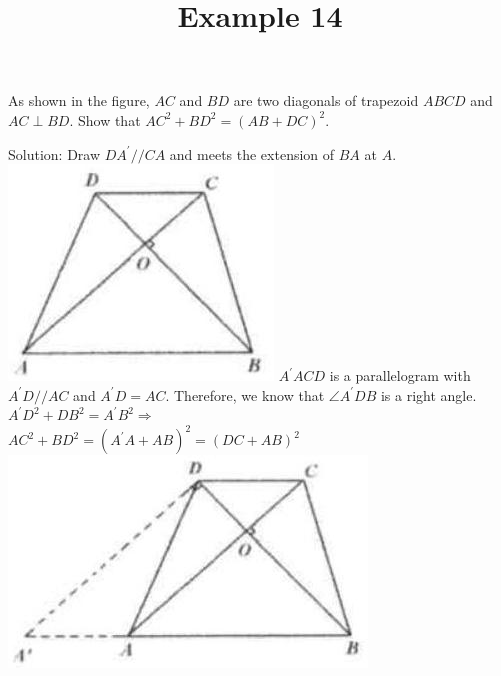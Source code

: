 \documentclass{article}
\title{Example 14}
\date{}
\begin{document}
\maketitle

As shown in the figure, \(A C\) and \(B D\) are two diagonals of trapezoid \(A B C D\) and \(A C \perp B D\). Show that \(A C^{2}+B D^{2}=(A B+D C)^{2}\).

Solution:
Draw \(D A^{\prime} / / C A\) and meets the extension of \(B A\) at \(A\).\\
\includegraphics[width=\textwidth]{images/problem_image_1.jpg} \(A^{\prime} A C D\) is a parallelogram with \(A^{\prime} D / / A C\) and \(A^{\prime} D=A C\). Therefore, we know that \(\angle A^{\prime} D B\) is a right angle.\\
\(A^{\prime} D^{2}+D B^{2}=A^{\prime} B^{2} \Rightarrow\)\\
\(A C^{2}+B D^{2}=\left(A^{\prime} A+A B\right)^{2}=(D C+A B)^{2}\)\\
\centering
\includegraphics[width=\textwidth]{images/reasoning_image_1.jpg}
\end{document}
